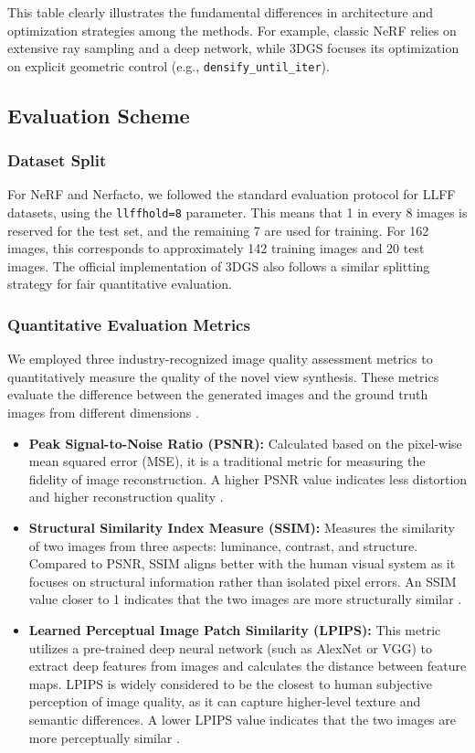 \documentclass[11pt]{article}
\begin{document}
This table clearly illustrates the fundamental differences in architecture and optimization strategies among the methods. For example, classic NeRF relies on extensive ray sampling and a deep network, while 3DGS focuses its optimization on explicit geometric control (e.g., \texttt{densify\_until\_iter}).

\subsection{Evaluation Scheme}

\subsubsection{Dataset Split}
For NeRF and Nerfacto, we followed the standard evaluation protocol for LLFF datasets, using the \texttt{llffhold=8} parameter. This means that 1 in every 8 images is reserved for the test set, and the remaining 7 are used for training. For 162 images, this corresponds to approximately 142 training images and 20 test images. The official implementation of 3DGS also follows a similar splitting strategy for fair quantitative evaluation.

\subsubsection{Quantitative Evaluation Metrics}
We employed three industry-recognized image quality assessment metrics to quantitatively measure the quality of the novel view synthesis. These metrics evaluate the difference between the generated images and the ground truth images from different dimensions \cite{benchmarking_metrics2025}.
\begin{itemize}
    \item \textbf{Peak Signal-to-Noise Ratio (PSNR):} Calculated based on the pixel-wise mean squared error (MSE), it is a traditional metric for measuring the fidelity of image reconstruction. A higher PSNR value indicates less distortion and higher reconstruction quality \cite{review_metrics_blog}.
    \item \textbf{Structural Similarity Index Measure (SSIM):} Measures the similarity of two images from three aspects: luminance, contrast, and structure. Compared to PSNR, SSIM aligns better with the human visual system as it focuses on structural information rather than isolated pixel errors. An SSIM value closer to 1 indicates that the two images are more structurally similar \cite{review_metrics_blog}.
    \item \textbf{Learned Perceptual Image Patch Similarity (LPIPS):} This metric utilizes a pre-trained deep neural network (such as AlexNet or VGG) to extract deep features from images and calculates the distance between feature maps. LPIPS is widely considered to be the closest to human subjective perception of image quality, as it can capture higher-level texture and semantic differences. A lower LPIPS value indicates that the two images are more perceptually similar \cite{benchmarking_metrics2025}.
\end{itemize}
\end{document}
